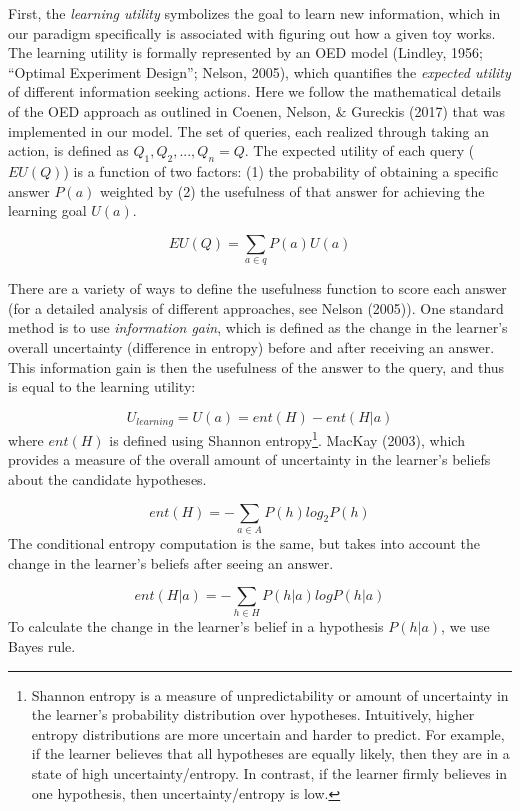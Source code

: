 \documentclass[10pt, letterpaper]{article}
\begin{document}
First, the \emph{learning utility} symbolizes the goal to learn new
information, which in our paradigm specifically is associated with
figuring out how a given toy works. The learning utility is formally
represented by an OED model (Lindley, 1956; ``Optimal Experiment
Design''; Nelson, 2005), which quantifies the \emph{expected utility} of
different information seeking actions. Here we follow the mathematical
details of the OED approach as outlined in Coenen, Nelson, \& Gureckis
(2017) that was implemented in our model. The set of queries, each
realized through taking an action, is defined as
\(Q_1, Q_2, ..., Q_n = {Q}\). The expected utility of each query
(\(EU(Q)\)) is a function of two factors: (1) the probability of
obtaining a specific answer \(P(a)\) weighted by (2) the usefulness of
that answer for achieving the learning goal \(U(a)\).

\[EU(Q) = \sum_{a\in q}{P(a)U(a)}\]

There are a variety of ways to define the usefulness function to score
each answer (for a detailed analysis of different approaches, see Nelson
(2005)). One standard method is to use \emph{information gain}, which is
defined as the change in the learner's overall uncertainty (difference
in entropy) before and after receiving an answer. This information gain
is then the usefulness of the answer to the query, and thus is equal to
the learning utility:

\[ U_{learning} = U(a) = ent(H) - ent(H|a)\] \noindent
where \(ent(H)\) is defined using Shannon
entropy\footnote{Shannon entropy is a measure of unpredictability or amount of uncertainty in the learner's probability distribution over hypotheses. Intuitively, higher entropy distributions are more uncertain and harder to predict. For example, if the learner believes that all hypotheses are equally likely, then they are in a state of high uncertainty/entropy. In contrast, if the learner firmly believes in one hypothesis, then uncertainty/entropy is low.}.
MacKay (2003), which provides a measure of the overall amount of
uncertainty in the learner's beliefs about the candidate hypotheses.

\[ent(H) = -\sum_{a\in A}{P(h)log_2P(h)}\] \noindent
The conditional entropy computation is the same, but takes into account
the change in the learner's beliefs after seeing an answer.

\[ ent(H|a) = -\sum_{h\in H}{P(h|a)logP(h|a)} \] \noindent
To calculate the change in the learner's belief in a hypothesis
\(P(h|a)\), we use Bayes rule.
\end{document}

